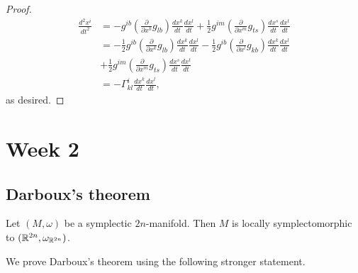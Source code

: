 \documentclass{amsart}
\begin{document}
\begin{proof}
    \begin{align*}
        \frac{d^2x^i}{dt^2} &= -g^{ib}\left( \frac{\partial}{\partial x^k}g_{lb} \right)\frac{dx^k}{dt}\frac{dx^l}{dt}
        +\frac{1}{2}g^{im}\left( \frac{\partial}{\partial x^m}g_{ts} \right)\frac{dx^s}{dt}\frac{dx^t}{dt}\\
        &= -\frac{1}{2}g^{ib}\left( \frac{\partial}{\partial x^k}g_{lb} \right)\frac{dx^k}{dt}\frac{dx^l}{dt}
        -\frac{1}{2}g^{ib}\left( \frac{\partial}{\partial x^l}g_{kb} \right)\frac{dx^k}{dt}\frac{dx^l}{dt}
        \\&+\frac{1}{2}g^{im}\left( \frac{\partial}{\partial x^m}g_{ts} \right)\frac{dx^s}{dt}\frac{dx^t}{dt}\\
        &= -\Gamma_{kl}^i\frac{dx^k}{dt}\frac{dx^l}{dt},
    \end{align*}
    as desired.
\end{proof}


\newpage
\section{Week 2}

\subsection{Darboux's theorem}

\begin{theorem}[Darboux]
    Let $(M,\omega)$ be a symplectic $2n$-manifold. Then $M$ is locally symplectomorphic to
    $(\mathbb{R}^{2n},\omega_{\mathbb{R}^{2n}})$.
\end{theorem}

We prove Darboux's theorem using the following stronger statement.
\end{document}
